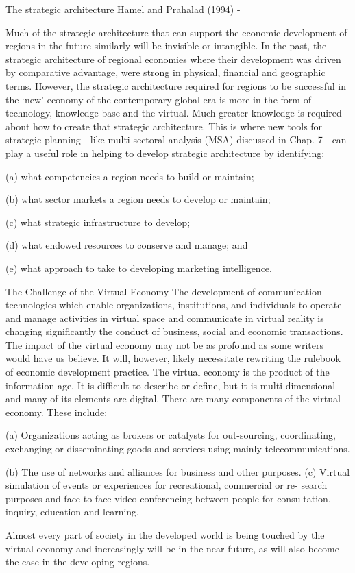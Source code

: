 The strategic architecture Hamel and Prahalad (1994) - \par
Much of the strategic architecture that can support the economic development of regions in the future similarly will be invisible or intangible. In the past, the strategic architecture of regional economies where their development was driven by comparative advantage, were strong in physical, financial and geographic terms. However, the strategic architecture required for regions to be successful in the ‘new’ economy of the contemporary global era is more in the form of technology, knowledge base and the virtual. Much greater knowledge is required about how to create that strategic architecture. This is where new tools for strategic planning—like multi-sectoral analysis (MSA) discussed in Chap. 7—can play a useful role in helping to develop strategic architecture by identifying:\par
(a) what competencies a region needs to build or maintain;\par
(b) what sector markets a region needs to develop or maintain;\par
(c) what strategic infrastructure to develop; \par
(d) what endowed resources to conserve and manage; and \par
(e) what approach to take to developing marketing intelligence.\par

The Challenge of the Virtual Economy
The development of communication technologies which enable organizations, institutions, and individuals to operate and manage activities in virtual space and communicate in virtual reality is changing significantly the conduct of business, social and economic transactions. The impact of the virtual economy may not be as profound as some writers would have us believe. It will, however, likely necessitate rewriting the rulebook of economic development practice. The virtual economy is the product of the information age. It is difficult to describe or define, but it is multi-dimensional and many of its elements are digital. There are many components of the virtual economy. These include:\par
(a) Organizations acting as brokers or catalysts for out-sourcing, coordinating, exchanging or disseminating goods and services using mainly telecommunications.\par
(b) The use of networks and alliances for business and other purposes. (c) Virtual simulation of events or experiences for recreational, commercial or re- search purposes and face to face video conferencing between people for consultation, inquiry, education and learning.\par
Almost every part of society in the developed world is being touched by the virtual economy and increasingly will be in the near future, as will also become the case in the developing regions.\par


